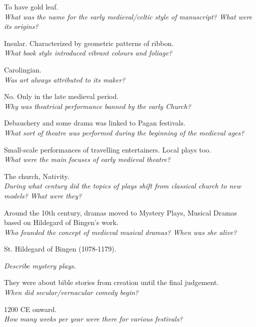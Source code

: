 \documentclass[12pt]{article}
\begin{document}
To have gold leaf.\\

\textit{What was the name for the early medieval/celtic style of manuscript? What were its origins?}

Insular. Characterized by geometric patterns of ribbon.\\

\textit{What book style introduced vibrant colours and foliage?}

Carolingian.\\

\textit{Was art always attributed to its maker?}

No. Only in the late medieval period.\\

\textit{Why was theatrical performance banned by the early Church?}

Debauchery and some drama was linked to Pagan festivals. \\

\textit{What sort of theatre was performed during the beginning of the medieval ages?}

Small-scale performances of travelling entertainers. Local plays too.\\

\textit{What were the main focuses of early medieval theatre?}

The church, Nativity.\\

\textit{During what century did the topics of plays shift from classical church to new models? What were they?}

Around the 10th century, dramas moved to Mystery Plays, Musical Dramas based on Hildegard of Bingen's work.\\

\textit{Who founded the concept of medieval musical dramas? When was she alive?}

St. Hildegard of Bingen (1078-1179).


\textit{Describe mystery plays.}

They were about bible stories from creation until the final judgement.\\

\textit{When did secular/vernacular comedy begin?}

1200 CE onward.\\


\textit{How many weeks per year were there for various festivals?}
\end{document}

